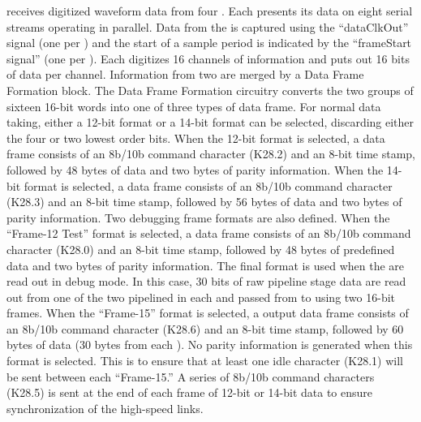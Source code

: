  receives digitized waveform data from 
four  . Each  presents its data on eight 
serial streams operating in parallel. Data from the  is captured 
using the  ``dataClkOut'' signal  
(one per ) and the start of a 
sample period is indicated by the ``frameStart signal'' (one per ). 
Each  digitizes \num{16} channels of information and puts out \num{16} bits 
of data per channel. Information from two  are merged by a Data 
Frame Formation block.  
The Data Frame Formation circuitry converts the two 
groups of sixteen \num{16}-bit words into one of three types of data frame. For normal 
data taking, either a \num{12}-bit format or a \num{14}-bit  format can be 
selected, discarding either the four or two lowest order bits. When the 
\num{12}-bit format is selected, a data frame consists of an 8b/10b command 
character (K28.2) and an \num{8}-bit time stamp, followed by \num{48} bytes of  
data and two bytes of parity information. When the \num{14}-bit format is selected, 
a data frame consists of an 8b/10b command character (K28.3) and an \num{8}-bit time 
stamp, followed by \num{56} bytes of  data and two bytes of parity 
information. Two debugging frame formats are also defined. When the ``Frame-12 Test'' 
format is selected, a data frame consists of an 8b/10b command character 
(K28.0) and an \num{8}-bit time stamp, followed by \num{48} bytes of predefined data 
and two bytes of parity information. The final format is used when the 
 are read out in debug mode. In this case, \num{30} bits of raw 
pipeline stage data are read out from one of the two pipelined  
in each   and passed from  to 
 using two \num{16}-bit frames. When the ``Frame-15'' format is 
selected, a  output data frame consists of an 8b/10b command 
character (K28.6) and an \num{8}-bit time stamp, followed by \num{60} bytes of  
data (\num{30} bytes from each ). No parity information is generated 
when this format is selected. This is to ensure that at least one idle 
character (K28.1) will be sent between each ``Frame-15.'' A series of 8b/10b 
command characters (K28.5) is sent at the end of each frame of \num{12}-bit or 
\num{14}-bit data to ensure synchronization of the high-speed links.

